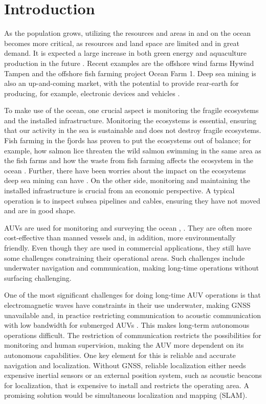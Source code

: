 \chapter{Introduction}

As the population grows, utilizing the resources and areas in and on the ocean becomes more critical, as resources and land space are limited and in great demand. It is expected a large increase in both green energy and aquaculture production in the future \cite{Oceans2050}. Recent examples are the offshore wind farms Hywind Tampen \cite{HywindEquinor} and the offshore fish farming project Ocean Farm 1\cite{HavbasertASA}. Deep sea mining is also an up-and-coming market, with the potential to provide rear-earth for producing, for example, electronic devices and vehicles \cite{Bogue2015UnderwaterApplications}.

To make use of the ocean, one crucial aspect is monitoring the fragile ecosystems and the installed infrastructure. Monitoring the ecosystems is essential, ensuring that our activity in the sea is sustainable and does not destroy fragile ecosystems. Fish farming in the fjords has proven to put the ecosystems out of balance; for example, how salmon lice threaten the wild salmon swimming in the same area as the fish farms and how the waste from fish farming affects the ecosystem in the ocean \cite{Fiskeoppdrett}. Further, there have been worries about the impact on the ecosystems deep sea mining can have \cite{UnderstandingTechnology}. On the other side, monitoring and maintaining the installed infrastructure is crucial from an economic perspective. A typical operation is to inspect subsea pipelines and cables, ensuring they have not moved and are in good shape. 

AUVs are used for monitoring and surveying the ocean \cite{Nicholson2008TheTechnologies}, \cite{HaugstadDenManeder}. They are often more cost-effective than manned vessels and, in addition, more environmentally friendly. Even though they are used in commercial applications, they still have some challenges constraining their operational areas. Such challenges include underwater navigation and communication, making long-time operations without surfacing challenging. 

One of the most significant challenges for doing long-time AUV operations is that electromagnetic waves have constraints in their use underwater, making GNSS unavailable and, in practice restricting communication to acoustic communication with low bandwidth for submerged AUVs \cite{Nicholson2008TheTechnologies}. This makes long-term autonomous operations difficult. The restriction of communication restricts the possibilities for monitoring and human supervision, making the AUV more dependent on its autonomous capabilities. One key element for this is reliable and accurate navigation and localization. Without GNSS, reliable localization either needs expensive inertial sensors or an external position system, such as acoustic beacons for localization, that is expensive to install and restricts the operating area. A promising solution would be simultaneous localization and mapping (SLAM).

